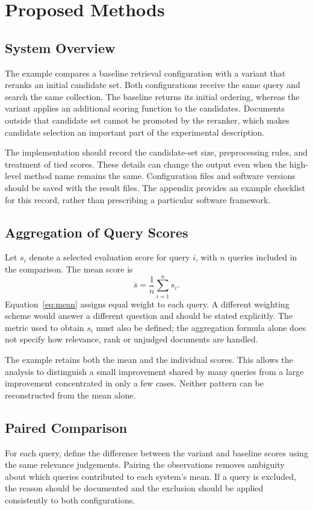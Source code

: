 \chapter{Proposed Methods}
\label{sec:approach}

\section{System Overview}
The example compares a baseline retrieval configuration with a variant that
reranks an initial candidate set. Both configurations receive the same query
and search the same collection. The baseline returns its initial ordering,
whereas the variant applies an additional scoring function to the candidates.
Documents outside that candidate set cannot be promoted by the reranker, which
makes candidate selection an important part of the experimental description.

The implementation should record the candidate-set size, preprocessing rules,
and treatment of tied scores. These details can change the output even when
the high-level method name remains the same. Configuration files and software
versions should be saved with the result files. The appendix provides an
example checklist for this record, rather than prescribing a particular
software framework.

\section{Aggregation of Query Scores}
Let $s_i$ denote a selected evaluation score for query $i$, with $n$ queries
included in the comparison. The mean score is
\begin{equation}
  \label{eq:mean}
  \bar{s} = \frac{1}{n}\sum_{i=1}^{n}s_i.
\end{equation}
Equation~\eqref{eq:mean} assigns equal weight to each query. A different weighting
scheme would answer a different question and should be stated explicitly.
The metric used to obtain $s_i$ must also be defined; the aggregation formula
alone does not specify how relevance, rank or unjudged documents are handled.

The example retains both the mean and the individual scores. This allows the
analysis to distinguish a small improvement shared by many queries from a
large improvement concentrated in only a few cases. Neither pattern can be
reconstructed from the mean alone.

\newpage
\section{Paired Comparison}
For each query, define the difference between the variant and baseline scores
using the same relevance judgements. Pairing the observations removes ambiguity
about which queries contributed to each system's mean. If a query is excluded,
the reason should be documented and the exclusion should be applied
consistently to both configurations.


